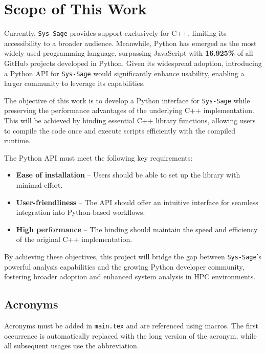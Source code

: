 \section{Scope of This Work}

Currently, \texttt{Sys-Sage} provides support exclusively for \ac{C++}, limiting its accessibility to a broader audience. Meanwhile, \ac{Python} has emerged as the most widely used programming language, surpassing JavaScript with \textbf{16.925\%} of all GitHub projects developed in \ac{Python}\parencite{python-github-stats}. Given its widespread adoption, introducing a \ac{Python} \ac{API} for \texttt{Sys-Sage} would significantly enhance usability, enabling a larger community to leverage its capabilities.

The objective of this work is to develop a \ac{Python} interface for \texttt{Sys-Sage} while preserving the performance advantages of the underlying \ac{C++} implementation. This will be achieved by binding essential \ac{C++} library functions, allowing users to compile the code once and execute scripts efficiently with the compiled runtime.

The \ac{Python} \ac{API} must meet the following key requirements:
\begin{itemize}
    \item \textbf{Ease of installation} – Users should be able to set up the library with minimal effort.
    \item \textbf{User-friendliness} – The \ac{API} should offer an intuitive interface for seamless integration into \ac{Python}-based workflows.
    \item \textbf{High performance} – The binding should maintain the speed and efficiency of the original \ac{C++} implementation.
\end{itemize}

By achieving these objectives, this project will bridge the gap between \texttt{Sys-Sage}'s powerful analysis capabilities and the growing \ac{Python} developer community, fostering broader adoption and enhanced system analysis in \ac{HPC} environments.

\subsection{Acronyms}

Acronyms must be added in \texttt{main.tex} and are referenced using macros. The first occurrence is automatically replaced with the long version of the acronym, while all subsequent usages use the abbreviation.

